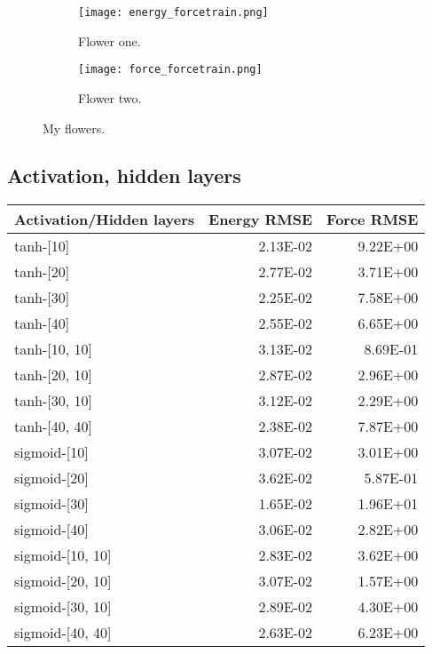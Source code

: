 \begin{figure}[!tbp]
\begin{adjustbox}{max width=1.2\linewidth,center}
\centering
  \begin{subfigure}[b]{0.55\textwidth}
      \texttt{[image: energy\_forcetrain.png]}
    \caption{Flower one.}
    \label{fig:f1}
  \end{subfigure}
  \hfill
  \begin{subfigure}[b]{0.55\textwidth}
      \texttt{[image: force\_forcetrain.png]}
    \caption{Flower two.}
    \label{fig:f2}
  \end{subfigure}
\end{adjustbox}
\caption{My flowers.}
\end{figure}


\subsection{Activation, hidden layers}

\begin{tabular}{lrr}
\toprule
Activation/Hidden layers &  Energy RMSE &  Force RMSE \\
\midrule
               tanh-[10] &     2.13E-02 &    9.22E+00 \\
               tanh-[20] &     2.77E-02 &    3.71E+00 \\
               tanh-[30] &     2.25E-02 &    7.58E+00 \\
               tanh-[40] &     2.55E-02 &    6.65E+00 \\
           tanh-[10, 10] &     3.13E-02 &    8.69E-01 \\
           tanh-[20, 10] &     2.87E-02 &    2.96E+00 \\
           tanh-[30, 10] &     3.12E-02 &    2.29E+00 \\
           tanh-[40, 40] &     2.38E-02 &    7.87E+00 \\
            sigmoid-[10] &     3.07E-02 &    3.01E+00 \\
            sigmoid-[20] &     3.62E-02 &    5.87E-01 \\
            sigmoid-[30] &     1.65E-02 &    1.96E+01 \\
            sigmoid-[40] &     3.06E-02 &    2.82E+00 \\
        sigmoid-[10, 10] &     2.83E-02 &    3.62E+00 \\
        sigmoid-[20, 10] &     3.07E-02 &    1.57E+00 \\
        sigmoid-[30, 10] &     2.89E-02 &    4.30E+00 \\
        sigmoid-[40, 40] &     2.63E-02 &    6.23E+00 \\
\bottomrule
\end{tabular}


